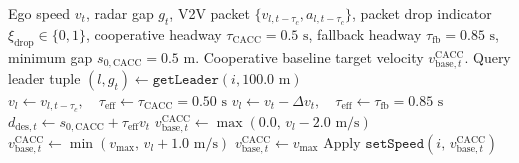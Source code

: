 \begin{algorithm}[htbp]
\caption{V2V-Enabled Cooperative Adaptive Cruise Control (CACC) with Packet-Drop Fallback}
\label{alg:cacc}
\begin{algorithmic}[1]
\Require Ego speed $v_t$, radar gap $g_t$, V2V packet $\{v_{l,t-\tau_c}, a_{l,t-\tau_c}\}$, packet drop indicator $\xi_{\text{drop}} \in \{0, 1\}$, cooperative headway $\tau_{\text{CACC}} = 0.5\text{ s}$, fallback headway $\tau_{\text{fb}} = 0.85\text{ s}$, minimum gap $s_{0,\text{CACC}} = 0.5\text{ m}$.
\Ensure Cooperative baseline target velocity $v_{\text{base},t}^{\text{CACC}}$.
    \State Query leader tuple $(l, g_t) \gets \texttt{getLeader}(i, 100.0\text{ m})$
            \State $v_l \gets v_{l,t-\tau_c}, \quad \tau_{\text{eff}} \gets \tau_{\text{CACC}} = 0.50\text{ s}$
        \Else
            \State $v_l \gets v_t - \Delta v_t, \quad \tau_{\text{eff}} \gets \tau_{\text{fb}} = 0.85\text{ s}$ 
        \EndIf
        \State $d_{\text{des},t} \gets s_{0,\text{CACC}} + \tau_{\text{eff}} v_t$
            \State $v_{\text{base},t}^{\text{CACC}} \gets \max(0.0, \, v_l - 2.0\text{ m/s})$
        \Else
            \State $v_{\text{base},t}^{\text{CACC}} \gets \min(v_{\max}, \, v_l + 1.0\text{ m/s})$
        \EndIf
    \Else
        \State $v_{\text{base},t}^{\text{CACC}} \gets v_{\max}$
    \EndIf
    \State Apply $\texttt{setSpeed}(i, \, v_{\text{base},t}^{\text{CACC}})$
\EndFor
\end{algorithmic}
\end{algorithm}
